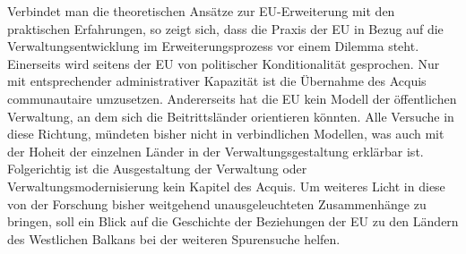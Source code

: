 Verbindet man die theoretischen Ansätze zur EU-Erweiterung mit den praktischen Erfahrungen, so zeigt sich, dass die Praxis der EU in Bezug auf die Verwaltungsentwicklung im Erweiterungsprozess vor einem Dilemma steht. Einerseits wird seitens der EU von politischer Konditionalität gesprochen. Nur mit entsprechender administrativer Kapazität ist die Übernahme des Acquis communautaire umzusetzen. Andererseits hat die EU kein Modell der öffentlichen Verwaltung, an dem sich die Beitrittsländer orientieren könnten. Alle Versuche in diese Richtung, mündeten bisher nicht in verbindlichen Modellen, was auch mit der Hoheit der einzelnen Länder in der Verwaltungsgestaltung erklärbar ist. Folgerichtig ist die Ausgestaltung der Verwaltung oder Verwaltungsmodernisierung kein Kapitel des Acquis. Um weiteres Licht in diese von der Forschung bisher weitgehend unausgeleuchteten Zusammenhänge zu bringen, soll ein Blick auf die Geschichte der Beziehungen der EU zu den Ländern des Westlichen Balkans bei der weiteren Spurensuche helfen.

